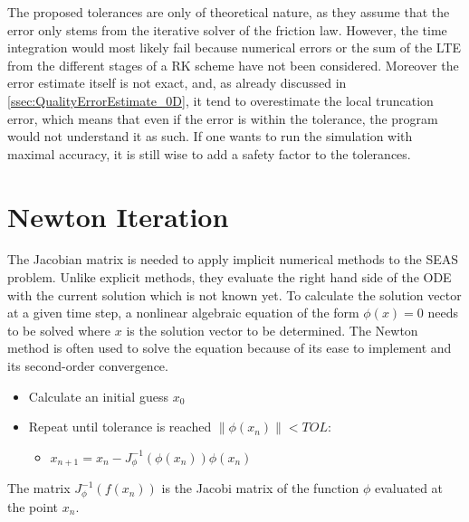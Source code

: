 The proposed tolerances are only of theoretical nature, as they assume that the error only stems from the iterative solver of the friction law. However, the time integration would most likely fail because numerical errors or the sum of the LTE from the different stages of a RK scheme have not been considered. Moreover the error estimate itself is not exact, and, as already discussed in \autoref{ssec:QualityErrorEstimate_0D}, it tend to overestimate the local truncation error, which means that even if the error is within the tolerance, the program would not understand it as such. If one wants to run the simulation with maximal accuracy, it is still wise to add a safety factor to the tolerances.


\section{Newton Iteration}
\label{ssec:ConvergenceNewtonIteration}
The Jacobian matrix is needed to apply implicit numerical methods to the SEAS problem. Unlike explicit methods, they evaluate the right hand side of the ODE with the current solution which is not known yet. To calculate the solution vector at a given time step, a nonlinear algebraic equation of the form $\phi(x) = 0$ needs to be solved where $x$ is the solution vector to be determined. The Newton method is often used to solve the equation because of its ease to implement and its second-order convergence. 

\begin{itemize}
	\item Calculate an initial guess $x_0$
	\item Repeat until tolerance is reached $\|\phi(x_n)\| < TOL$: 
	\begin{itemize}
		\item $x_{n+1} = x_n - J_\phi^{-1}(\phi(x_n)) \phi(x_n)$
	\end{itemize} 
\end{itemize}

The matrix $J_\phi^{-1}(f(x_n))$ is the Jacobi matrix of the function $\phi$ evaluated at the point $x_n$. \\

